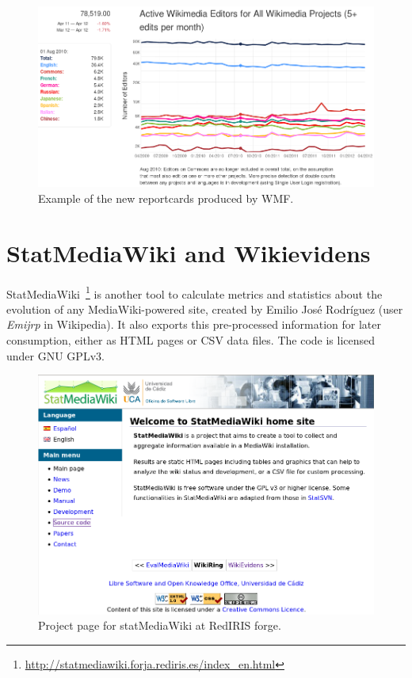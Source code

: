 \begin{figure}[h]
  \centering
    \includegraphics[width=\textwidth]{figs/wmflabs-reportcard}
  \caption{Example of the new reportcards produced by WMF.}
\end{figure}

\section{StatMediaWiki and Wikievidens}
StatMediaWiki~\footnote{\url{http://statmediawiki.forja.rediris.es/index_en.html}}
is another tool to calculate metrics and statistics about the evolution of any
MediaWiki-powered site, created by Emilio José Rodríguez (user \textit{Emijrp} in
Wikipedia). It also exports this pre-processed information for later consumption,
either as HTML pages or CSV data files. The code is licensed under GNU GPLv3.

\begin{figure}[h]
  \centering
    \includegraphics[width=\textwidth]{figs/statMediaWiki}
  \caption{Project page for statMediaWiki at RedIRIS forge.}
\end{figure}

